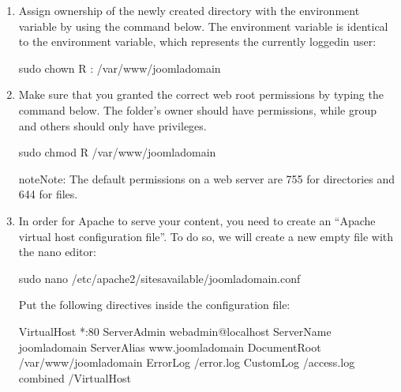 \documentclass[letterpaper,10pt,english]{sphinxmanual}
\begin{document}
\begin{enumerate}
\item {} 
\sphinxAtStartPar
Assign ownership of the newly created directory with the  environment variable by using the command below. The  environment variable is identical to the  environment variable, which represents the currently logged\sphinxhyphen{}in user:

\begin{sphinxVerbatim}[commandchars=\\\{\}]
\PYGZdl{} sudo chown \PYGZhy{}R : /var/www/joomla\PYGZhy{}domain
\end{sphinxVerbatim}

\item {} 
\sphinxAtStartPar
Make sure that you granted the correct web root permissions by typing the command below. The folder’s owner should have  permissions, while group and others should only have  privileges.

\begin{sphinxVerbatim}[commandchars=\\\{\}]
\PYGZdl{} sudo chmod \PYGZhy{}R  /var/www/joomla\PYGZhy{}domain
\end{sphinxVerbatim}

\begin{sphinxadmonition}{note}{Note:}
\sphinxAtStartPar
The default permissions on a web server are 755 for directories and 644 for files.
\end{sphinxadmonition}

\item {} 
\sphinxAtStartPar
In order for Apache to serve your content, you need to create an “Apache virtual host configuration file”. To do so, we will create a new empty file with the nano editor:

\begin{sphinxVerbatim}[commandchars=\\\{\}]
\PYGZdl{} sudo nano /etc/apache2/sites\PYGZhy{}available/joomla\PYGZhy{}domain.conf
\end{sphinxVerbatim}

\sphinxAtStartPar
Put the following directives inside the configuration file:

\begin{sphinxVerbatim}[commandchars=\\\{\},numbers=left,firstnumber=1,stepnumber=1]
\PYGZlt{}VirtualHost *:80\PYGZgt{}
ServerAdmin webadmin@localhost
ServerName joomla\PYGZhy{}domain
ServerAlias www.joomla\PYGZhy{}domain
DocumentRoot /var/www/joomla\PYGZhy{}domain
ErrorLog /error.log
CustomLog /access.log combined
\PYGZlt{}/VirtualHost\PYGZgt{}
\end{sphinxVerbatim}


\end{enumerate}
\end{document}
